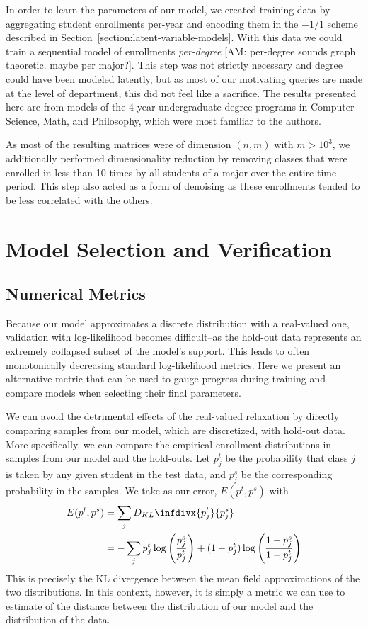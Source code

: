 \documentclass{edm_template}
\newcommand{\infdiv}{D_{KL}\infdivx}
\providecommand{\am}[1]{{\color{blue} [AM: #1]}}
\begin{document}
In order to learn the parameters of our model, we created training data by aggregating student enrollments per-year and encoding them in the $-1/1$ scheme described in Section~\ref{section:latent-variable-models}. With this data we could train a sequential model of enrollments \textit{per-degree} \am{per-degree sounds graph theoretic. maybe per major?}. This step was not strictly necessary and degree could have been modeled latently, but as most of our motivating queries are made at the level of department, this did not feel like a sacrifice. The results presented here are from models of the 4-year undergraduate degree programs in Computer Science, Math, and Philosophy, which were most familiar to the authors. 

As most of the resulting matrices were of dimension $(n,m)$ with $m > 10^3$, we additionally performed dimensionality reduction by removing classes that were enrolled in less than 10 times by all students of a major over the entire time period. This step also acted as a form of denoising as these enrollments tended to be less correlated with the others. 

\section{Model Selection and Verification}

\subsection{Numerical Metrics}

Because our model approximates a discrete distribution with a real-valued one, validation with log-likelihood becomes difficult--as the hold-out data represents an extremely collapsed subset of the model's support. This leads to often monotonically decreasing standard log-likelihood metrics. Here we present an alternative metric that can be used to gauge progress during training and compare models when selecting their final parameters. 

We can avoid the detrimental effects of the real-valued relaxation by directly comparing samples from our model, which are discretized, with hold-out data. More specifically, we can compare the empirical enrollment distributions in samples from our model and the hold-outs. Let $p^t_j$ be the probability that class $j$ is taken by any given student in the test data, and $p^s_j$ be the corresponding probability in the samples. We take as our error, $E(p^t,p^s)$ with 
\begin{align*}
 E(p^t,p^s) 
 &= \sum_j \infdiv{p^t_j} {p^s_j} \\
 &= - \sum_j p^t_j \log \left( \frac{p^s_j}{p^t_j} \right) + (1 - p^t_j) \log \left(\frac{1-p^s_j}{1 - p^t_j} \right)
\end{align*}
This is precisely the KL divergence between the mean field approximations of the two distributions. In this context, however, it is simply a metric we can use to estimate of the distance between the distribution of our model and the distribution of the data. 
\end{document}
